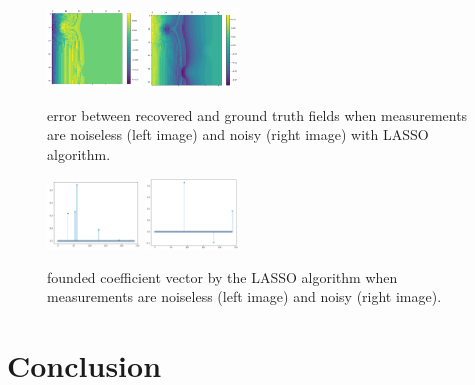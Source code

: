 \documentclass[conference]{IEEEtran}
\begin{document}
\begin{figure}[!ht]
  \centering
  \includegraphics[width=0.22\textwidth]{figure/2d_err_lasso.png}
    \hspace{0.01\textwidth}
    \includegraphics[width=0.225\textwidth]{figure/2d_err_lasso_noisy.png}
  \caption{error between recovered and ground truth fields when measurements are noiseless (left image) and noisy (right image) with LASSO algorithm.}\label{fig::err-2D}
\end{figure}


\begin{figure}[!ht]
  \centering
  \includegraphics[width=0.22\textwidth]{figure/2d_coeff_lasso.png}
    \hspace{0.01\textwidth}
    \includegraphics[width=0.22\textwidth]{figure/2d_coeff_lasso_noisy.png}
  \caption{founded coefficient vector by the LASSO algorithm when measurements are noiseless (left image) and noisy (right image).}\label{fig::coeff-2D}
\end{figure}


\section{Conclusion}
\end{document}
